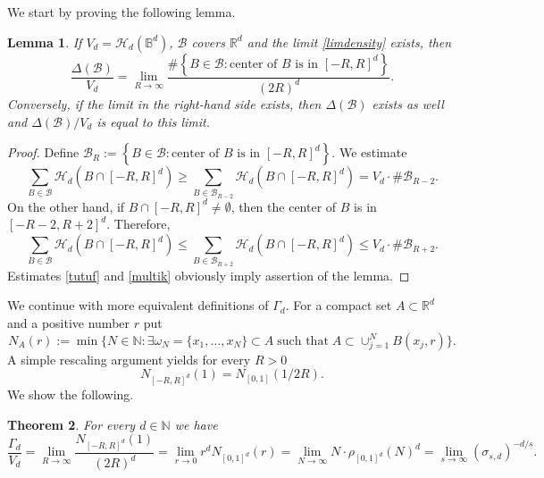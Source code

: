 \documentclass[12pt]{amsart}
\newtheorem{theorem}{Theorem}[section]
\newtheorem{lemma}[theorem]{Lemma}
\theoremstyle{definition}
\def\R{\mathbb{R}}
\newcommand{\1}{\mathbf{1}}
\def\H{\mathcal{H}}
\begin{document}
We start by proving the following lemma.
\begin{lemma}\label{lemmatratata}
If $V_d=\H_d(\mathbb{B}^d)$, $\mathcal{B}$ covers $\R^d$ and the limit \eqref{limdensity} exists, then 
$$
\frac{\Delta(\mathcal{B})}{V_d}=\lim_{R\to \infty} \frac{\#\left\{B\in \mathcal{B}\colon \text{center of $B$ is in $[-R,R]^d$}\right\}}{(2R)^d}.
$$
Conversely, if the limit in the right-hand side exists, then $\Delta(\mathcal{B})$ exists as well and $\Delta(\mathcal{B})/V_d$ is equal to this limit.
\end{lemma}
\begin{proof}
Define $\mathcal{B}_R:=\left\{B\in \mathcal{B}\colon \mbox{center of $B$ is in $[-R,R]^d$}\right\}$. We estimate
\begin{equation}\label{tutuf}
\sum_{B\in \mathcal{B}} \H_d(B\cap [-R,R]^d)\geqslant \sum_{B\in \mathcal{B}_{R-2}} \H_d(B\cap [-R,R]^d) = V_d \cdot \#\mathcal{B}_{R-2}.
\end{equation}
On the other hand, if $B\cap [-R,R]^d \not=\emptyset$, then the center of $B$ is in $[-R-2, R+2]^d$. Therefore,
\begin{equation}\label{multik}
\sum_{B\in \mathcal{B}} \H_d(B\cap [-R,R]^d) \leqslant \sum_{B\in \mathcal{B}_{R+2}}\H_d(B\cap [-R,R]^d) \leqslant V_d \cdot \#\mathcal{B}_{R+2}.
\end{equation}
Estimates \eqref{tutuf} and \eqref{multik} obviously imply assertion of the lemma.
\end{proof}
We continue with more equivalent definitions of $\Gamma_d$. For a compact set $A\subset \R^d$ and a positive number $r$ put 
$$
N_A(r):=\min\Big\{N\in \mathbb{N}\colon \exists \omega_N=\{x_1, \ldots, x_N\}\subset A \; \mbox{such that} \; A\subset \cup_{j=1}^N B(x_j, r)\Big\}.
$$
A simple rescaling argument yields for every $R>0$
$$
N_{[-R, R]^d}(1) = N_{[0,1]}(1/2R).
$$
We show the following.
\begin{theorem}
For every $d \in \mathbb{N}$ we have
\begin{equation}\label{tyanitolkay}
\frac{\Gamma_d}{V_d}=\lim_{R\to \infty} \frac{N_{[-R, R]^d}(1)}{(2R)^d} = \lim_{r\to 0} r^d N_{[0,1]^d}(r) = \lim_{N\to \infty} N\cdot \rho_{[0,1]^d}(N)^d = \lim_{s\to \infty}(\sigma_{s,d})^{-d/s}.
\end{equation}
\end{theorem}
\end{document}
